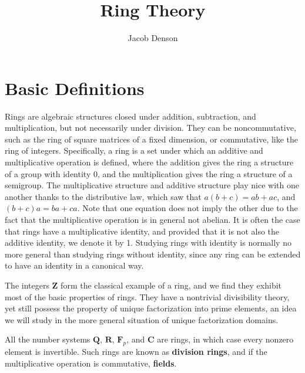 

\title{Ring Theory}
\author{Jacob Denson}



\maketitle
\tableofcontents

\chapter{Basic Definitions}


Rings are algebraic structures closed under addition, subtraction, and multiplication, but not necessarily under division. They can be noncommutative, such as the ring of square matrices of a fixed dimension, or commutative, like the ring of integers. Specifically, a ring is a set under which an additive and multiplicative operation is defined, where the addition gives the ring a structure of a group with identity 0, and the multiplication gives the ring a structure of a semigroup. The multiplicative structure and additive structure play nice with one another thanks to the distributive law, which saw that $a(b+c) = ab + ac$, and $(b + c)a = ba + ca$. Note that one equation does not imply the other due to the fact that the multiplicative operation is in general not abelian. It is often the case that rings have a multiplicative identity, and provided that it is not also the additive identity, we denote it by 1. Studying rings with identity is normally no more general than studying rings without identity, since any ring can be extended to have an identity in a canonical way.

\begin{example}
    The integers $\mathbf{Z}$ form the classical example of a ring, and we find they exhibit most of the basic properties of rings. They have a nontrivial divisibility theory, yet still possess the property of unique factorization into prime elements, an idea we will study in the more general situation of unique factorization domains.
\end{example}

\begin{example}
    All the number systems $\mathbf{Q}$, $\mathbf{R}$, $\mathbf{F}_p$, and $\mathbf{C}$ are rings, in which case every nonzero element is invertible. Such rings are known as {\bf division rings}, and if the multiplicative operation is commutative, {\bf fields}.
\end{example}

